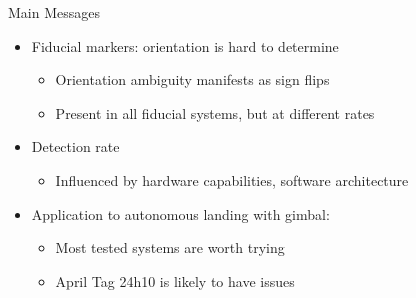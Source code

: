 \documentclass[aspectratio=169]{beamer}
\begin{document}
\begin{frame}{Main Messages}
	\begin{itemize}
		\item Fiducial markers: orientation is hard to determine
		\begin{itemize}
			\item Orientation ambiguity manifests as sign flips
			\item Present in all fiducial systems, but at different rates
		\end{itemize}
		\item Detection rate
		\begin{itemize}
			\item Influenced by hardware capabilities, software architecture
		\end{itemize}
		\item Application to autonomous landing with gimbal:
		\begin{itemize}
			\item Most tested systems are worth trying
			\item April Tag 24h10 is likely to have issues
		\end{itemize}
	\end{itemize}
\end{frame}

%	
%	
\end{document}
